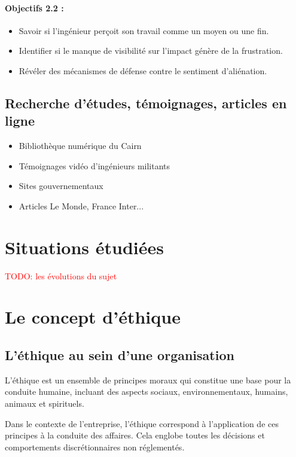 \documentclass[12pt,a4paper]{report}
\begin{document}
\paragraph{Objectifs 2.2 :}
\begin{itemize}
    \item Savoir si l'ingénieur perçoit son travail comme un moyen ou une fin.
    \item Identifier si le manque de visibilité sur l'impact génère de la frustration.
    \item Révéler des mécanismes de défense contre le sentiment d'aliénation.
\end{itemize}

\subsection{Recherche d'études, témoignages, articles en ligne}

\begin{itemize}
    \item Bibliothèque numérique du Cairn
    \item Témoignages vidéo d'ingénieurs militants
    \item Sites gouvernementaux
    \item Articles Le Monde, France Inter...
\end{itemize}

\section{Situations étudiées}

\textcolor{red}{TODO: les évolutions du sujet}

\section{Le concept d'éthique}

\subsection{L'éthique au sein d'une organisation}

L'éthique est un ensemble de principes moraux qui constitue une base pour la conduite humaine, incluant des aspects sociaux, environnementaux, humains, animaux et spirituels.

Dans le contexte de l'entreprise, l'éthique correspond à l'application de ces principes à la conduite des affaires. Cela englobe toutes les décisions et comportements discrétionnaires non réglementés.
\end{document}
